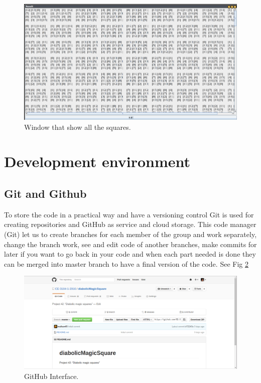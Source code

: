 \documentclass[12pt]{article}
\begin{document}
\begin{itemize}
\begin{figure}[h!]
 	\centering
  	\includegraphics[scale=0.5]
  	{Images/inter3.png}
  	\caption{Window that show all the squares.}
     \label{inter3}
\end{figure}


\end{itemize}




\newpage
\section{Development environment}

\subsection{Git and Github}
To store the code in a practical way and have a versioning control Git is used  for creating repositories and GitHub as service and cloud storage. This code manager (Git) let us to create branches for each member of the group and work separately, change the branch work, see and edit code of another branches, make commits for later if you want to go back in your code and when each part needed is done they can be merged into master branch to have a final version of the code. See Fig \ref{git}
\begin{figure}[h!]
 	\centering
  	\includegraphics[scale=0.3]
  	{Images/GitHub.png}
  	\caption{GitHub Interface.}
     \label{git}
\end{figure}
\end{document}
